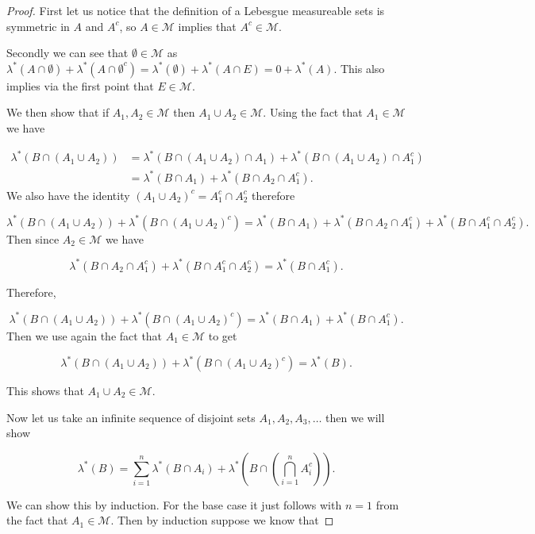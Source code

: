 \documentclass[
]{book}
\theoremstyle{definition}
\theoremstyle{definition}
\theoremstyle{definition}
\theoremstyle{definition}
\theoremstyle{remark}
\begin{document}
\begin{proof}
First let us notice that the definition of a Lebesgue measureable sets is symmetric in \(A\) and \(A^c\), so \(A \in \mathscr{M}\) implies that \(A^c \in \mathscr{M}\).

Secondly we can see that \(\emptyset \in \mathscr{M}\) as \(\lambda^*(A\cap \emptyset) + \lambda^*(A \cap \emptyset^c) = \lambda^*(\emptyset) + \lambda^*(A \cap E) = 0+ \lambda^*(A)\). This also implies via the first point that \(E \in \mathscr{M}\).

We then show that if \(A_1, A_2 \in \mathscr{M}\) then \(A_1 \cup A_2 \in \mathscr{M}\). Using the fact that \(A_1 \in \mathscr{M}\) we have

\begin{align*} \lambda^*(B \cap (A_1 \cup A_2)) &= \lambda^*(B \cap (A_1 \cup A_2) \cap A_1) + \lambda^*(B \cap(A_1 \cup A_2) \cap A_1^c)\\
&= \lambda^* (B \cap A_1)  + \lambda^* (B \cap A_2 \cap A_1^c).  
\end{align*}
We also have the identity \((A_1 \cup A_2)^c = A_1^c \cap A_2^c\) therefore

\[ \lambda^*(B \cap (A_1 \cup A_2)) + \lambda^*(B \cap (A_1 \cup A_2)^c) = \lambda^*(B \cap A_1) + \lambda^* (B \cap A_2 \cap A_1^c) + \lambda^*(B \cap A_1^c \cap A_2^c). \]
Then since \(A_2 \in \mathscr{M}\) we have

\[  \lambda^* (B \cap A_2 \cap A_1^c) + \lambda^*(B \cap A_1^c \cap A_2^c) = \lambda^*(B \cap A_1^c).\]

Therefore,

\[  \lambda^*(B \cap (A_1 \cup A_2)) + \lambda^*(B \cap (A_1 \cup A_2)^c) = \lambda^*(B \cap A_1) + \lambda^*(B \cap A_1^c). \]
Then we use again the fact that \(A_1 \in \mathscr{M}\) to get

\[  \lambda^*(B \cap (A_1 \cup A_2)) + \lambda^*(B \cap (A_1 \cup A_2)^c) =\lambda^*(B). \]

This shows that \(A_1 \cup A_2 \in \mathscr{M}\).

Now let us take an infinite sequence of disjoint sets \(A_1, A_2, A_3, \dots\) then we will show

\[ \lambda^*(B) = \sum_{i=1}^n \lambda^* (B \cap A_i) + \lambda^*\left( B \cap \left( \bigcap_{i=1}^n A_i^c \right) \right). \]

We can show this by induction. For the base case it just follows with \(n=1\) from the fact that \(A_1 \in \mathscr{M}\). Then by induction suppose we know that


\end{proof}
\end{document}

